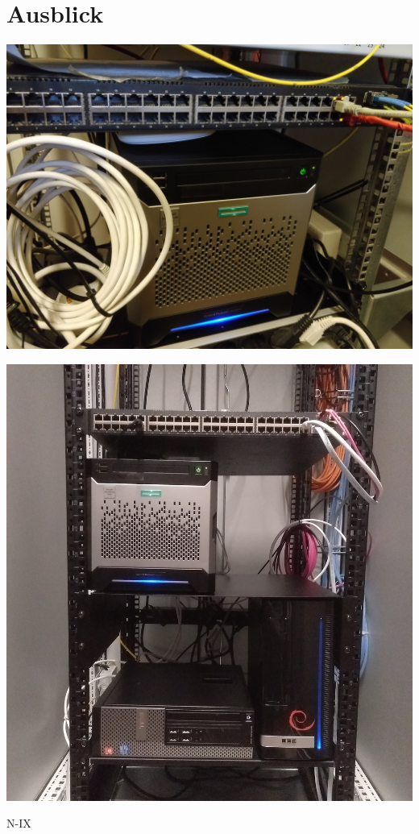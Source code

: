 \documentclass{beamer}
\begin{document}
	\section{Ausblick}
	\begin{frame}
		\centering
		\includegraphics[width=\framewidth]{media/zbau-server.jpg}
	\end{frame}
	\begin{frame}
		\centering
		\includegraphics[height=\textheight]{media/zbau-server-neu.jpg}
	\end{frame}
	\begin{frame}{N-IX}
	\end{frame}
\end{document}
